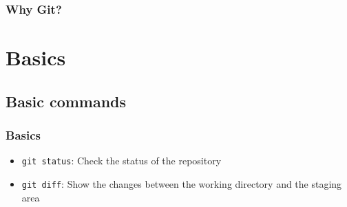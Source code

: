 \documentclass{beamer}
\begin{document}
    \begin{frame}
        \frametitle{Why Git?}
        \begin{figure}[H]
            \centering
            \noindent
        \end{figure}
    \end{frame}


    \section{Basics}\label{sec:basics}

    \subsection{Basic commands}\label{subsec:basic-commands}
    \begin{frame}
        \frametitle{Basics}
        \begin{figure}[H]
            \centering
            \noindent
            \label{fig:figure2}
        \end{figure}
    \end{frame}
    \begin{frame}
        \begin{itemize}
            \item \texttt{git status}: Check the status of the repository
            \item \texttt{git diff}: Show the changes between the working directory and the staging area
        \end{itemize}
    \end{frame}
\end{document}
